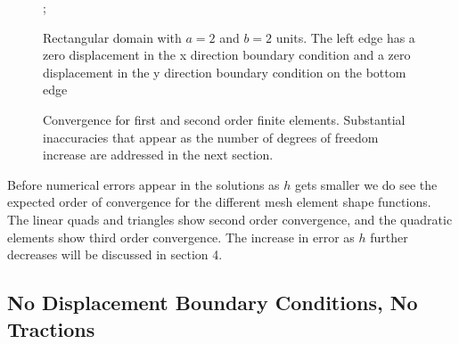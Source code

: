 \documentclass{article}
\begin{document}
\begin{figure}
    ;
    \caption{Rectangular domain with $a=2$ and $b=2$ units. The left edge has a zero displacement in the x direction boundary condition and a zero displacement in the y direction boundary condition on the bottom edge}
\centering
\end{figure}

\begin{figure}
    \caption{Convergence for first and second order finite elements. Substantial inaccuracies that appear as the number of degrees of freedom increase are addressed in the next section.}
\centering
\end{figure}

Before numerical errors appear in the solutions as $h$ gets smaller we do see the expected order of convergence for the different mesh element shape functions. The linear quads and triangles show second order convergence, and the quadratic elements show third order convergence. The increase in error as $h$ further decreases will be discussed in section 4.

\pagebreak
\subsection{No Displacement Boundary Conditions, No Tractions}
\FloatBarrier
\end{document}
